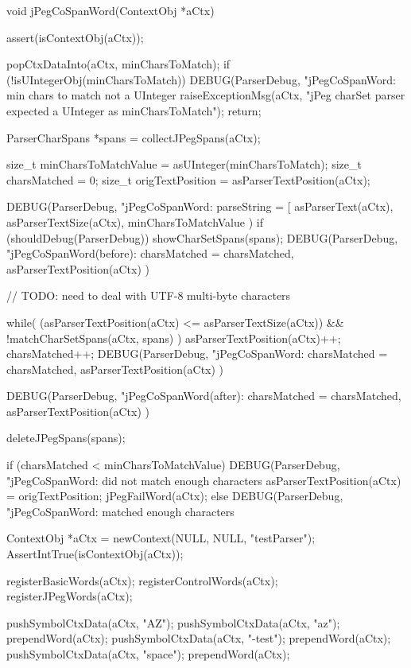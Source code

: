 \startCCode
void jPegCoSpanWord(ContextObj *aCtx) {
  assert(isContextObj(aCtx));
  
  popCtxDataInto(aCtx, minCharsToMatch);
  if (!isUIntegerObj(minCharsToMatch)) {
    DEBUG(ParserDebug,
      "jPegCoSpanWord: min chars to match not a UInteger%
    raiseExceptionMsg(aCtx,
      "jPeg charSet parser expected a UInteger as minCharsToMatch");
    return;
  }
  
  ParserCharSpans *spans = collectJPegSpans(aCtx);
  
  size_t minCharsToMatchValue = asUInteger(minCharsToMatch);
  size_t charsMatched         = 0;
  size_t origTextPosition     = asParserTextPosition(aCtx);
  
  DEBUG(ParserDebug,
    "jPegCoSpanWord: parseString = [%
    asParserText(aCtx), asParserTextSize(aCtx), minCharsToMatchValue
  )
  if (shouldDebug(ParserDebug)) showCharSetSpans(spans);
  DEBUG(ParserDebug,
    "jPegCoSpanWord(before): charsMatched = %
    charsMatched, asParserTextPosition(aCtx)
  )
 
  // TODO: need to deal with UTF-8 multi-byte characters
  
  while(
    (asParserTextPosition(aCtx) <= asParserTextSize(aCtx)) &&
    !matchCharSetSpans(aCtx, spans)
  ) {
    asParserTextPosition(aCtx)++;
    charsMatched++;
    DEBUG(ParserDebug,
      "jPegCoSpanWord: charsMatched = %
      charsMatched, asParserTextPosition(aCtx)
    )
  }

  DEBUG(ParserDebug,
    "jPegCoSpanWord(after): charsMatched = %
    charsMatched, asParserTextPosition(aCtx)
  )

  deleteJPegSpans(spans);

  if (charsMatched < minCharsToMatchValue) {
    DEBUG(ParserDebug,
      "jPegCoSpanWord: did not match enough characters%
    asParserTextPosition(aCtx) = origTextPosition;
    jPegFailWord(aCtx);
  } else {
    DEBUG(ParserDebug, 
      "jPegCoSpanWord: matched enough characters%
  }
}
\stopCCode


\startCTest
  ContextObj *aCtx = newContext(NULL, NULL, "testParser");
  AssertIntTrue(isContextObj(aCtx));
  
  registerBasicWords(aCtx);
  registerControlWords(aCtx);
  registerJPegWords(aCtx);
  
  pushSymbolCtxData(aCtx, "AZ");
  pushSymbolCtxData(aCtx, "az");
  prependWord(aCtx);
  pushSymbolCtxData(aCtx, "-test");
  prependWord(aCtx);
  pushSymbolCtxData(aCtx, "space");
  prependWord(aCtx);
  
